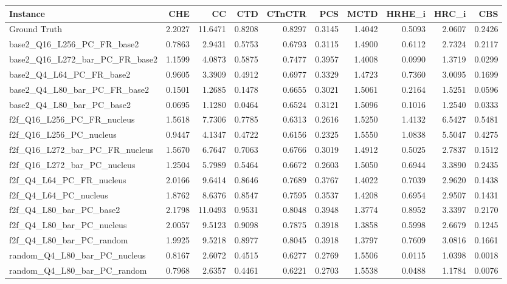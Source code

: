 \begin{tabular}{lrrrrrrrrr}
\toprule
Instance & CHE & CC & CTD & CTnCTR & PCS & MCTD & HRHE_i & HRC_i & CBS \\
\midrule
Ground Truth & 2.2027 & 11.6471 & 0.8208 & 0.8297 & 0.3145 & 1.4042 & 0.5093 & 2.0607 & 0.2426 \\
base2_Q16_L256_PC_FR_base2 & 0.7863 & 2.9431 & 0.5753 & 0.6793 & 0.3115 & 1.4900 & 0.6112 & 2.7324 & 0.2117 \\
base2_Q16_L272_bar_PC_FR_base2 & 1.1599 & 4.0873 & 0.5875 & 0.7477 & 0.3957 & 1.4008 & 0.0990 & 1.3719 & 0.0299 \\
base2_Q4_L64_PC_FR_base2 & 0.9605 & 3.3909 & 0.4912 & 0.6977 & 0.3329 & 1.4723 & 0.7360 & 3.0095 & 0.1699 \\
base2_Q4_L80_bar_PC_FR_base2 & 0.1501 & 1.2685 & 0.1478 & 0.6655 & 0.3021 & 1.5061 & 0.2164 & 1.5251 & 0.0596 \\
base2_Q4_L80_bar_PC_base2 & 0.0695 & 1.1280 & 0.0464 & 0.6524 & 0.3121 & 1.5096 & 0.1016 & 1.2540 & 0.0333 \\
f2f_Q16_L256_PC_FR_nucleus & 1.5618 & 7.7306 & 0.7785 & 0.6313 & 0.2616 & 1.5250 & 1.4132 & 6.5427 & 0.5481 \\
f2f_Q16_L256_PC_nucleus & 0.9447 & 4.1347 & 0.4722 & 0.6156 & 0.2325 & 1.5550 & 1.0838 & 5.5047 & 0.4275 \\
f2f_Q16_L272_bar_PC_FR_nucleus & 1.5670 & 6.7647 & 0.7063 & 0.6766 & 0.3019 & 1.4912 & 0.5025 & 2.7837 & 0.1512 \\
f2f_Q16_L272_bar_PC_nucleus & 1.2504 & 5.7989 & 0.5464 & 0.6672 & 0.2603 & 1.5050 & 0.6944 & 3.3890 & 0.2435 \\
f2f_Q4_L64_PC_FR_nucleus & 2.0166 & 9.6414 & 0.8646 & 0.7689 & 0.3767 & 1.4022 & 0.7039 & 2.9620 & 0.1438 \\
f2f_Q4_L64_PC_nucleus & 1.8762 & 8.6376 & 0.8547 & 0.7595 & 0.3537 & 1.4208 & 0.6954 & 2.9507 & 0.1431 \\
f2f_Q4_L80_bar_PC_base2 & 2.1798 & 11.0493 & 0.9531 & 0.8048 & 0.3948 & 1.3774 & 0.8952 & 3.3397 & 0.2170 \\
f2f_Q4_L80_bar_PC_nucleus & 2.0057 & 9.5123 & 0.9098 & 0.7875 & 0.3918 & 1.3858 & 0.5998 & 2.6679 & 0.1245 \\
f2f_Q4_L80_bar_PC_random & 1.9925 & 9.5218 & 0.8977 & 0.8045 & 0.3918 & 1.3797 & 0.7609 & 3.0816 & 0.1661 \\
random_Q4_L80_bar_PC_nucleus & 0.8167 & 2.6072 & 0.4515 & 0.6277 & 0.2769 & 1.5506 & 0.0115 & 1.0398 & 0.0018 \\
random_Q4_L80_bar_PC_random & 0.7968 & 2.6357 & 0.4461 & 0.6221 & 0.2703 & 1.5538 & 0.0488 & 1.1784 & 0.0076 \\
\bottomrule
\end{tabular}
